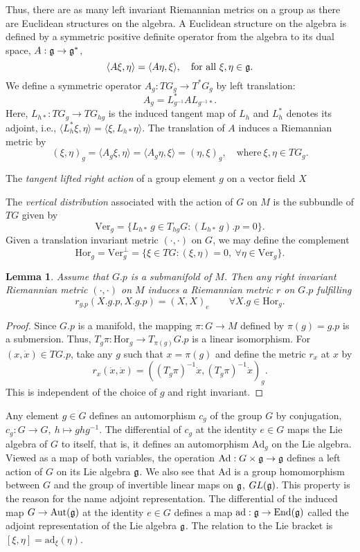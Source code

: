 \documentclass{article}
\theoremstyle{plain}
\newtheorem{lem}[teo]{Lemma}
\theoremstyle{definition}
\newcommand{\Ad}{\ensuremath{\mathrm{Ad}}}
\newcommand{\ad}{\ensuremath{\mathrm{ad}}}
\newcommand{\mf}{\ensuremath{\mathfrak}}
\begin{document}
Thus, there are as many left invariant Riemannian metrics on a group as there are Euclidean structures on the algebra. A Euclidean structure on the algebra is defined by a symmetric positive definite operator from the algebra to its dual space, $A:\mf g\to\mf g^*$,
\[
\langle A \xi,\eta\rangle = \langle A\eta,\xi\rangle,\quad \mathrm{for}\ \mathrm{all}\ \xi,\eta\in \mf g.
\]
We define a symmetric operator $A_g:TG_g\to T^*G_g$ by left translation:
\[
 A_g = L^*_{g^{-1}}AL_{g^{-1}*}.
\]
Here, $L_{h*}:TG_g\to TG_{hg}$ is the induced tangent map of $L_h$ and $L^*_h$ denotes its adjoint, i.e., $\langle L_h^*\xi,\eta\rangle=\langle \xi,L_{h*}\eta\rangle$. The translation of $A$ induces a Riemannian metric by
\[
  (\xi,\eta)_g=\langle A_g \xi,\eta\rangle=\langle A_g \eta,\xi\rangle=(\eta,\xi)_g,\quad \mathrm{where}\ \xi,\eta\in TG_g.
\]

The \textit{tangent lifted right action} of a group element $g$ on a vector field $X$

The \textit{vertical distribution} associated with the action of $G$ on $M$ is the subbundle of $TG$ given by
\[
\mathrm{Ver}_g=\{L_{h*}\,g\in T_{hg}G : (L_{h*}\,g).p=0\}.
\]
Given a translation invariant metric $(\cdot,\cdot)$ on $G$, we may define the complement
\[
\mathrm{Hor}_g=\mathrm{Ver}_g^\perp=\{\xi\in TG : (\xi,\eta)=0,\ \forall\eta\in\mathrm{Ver}_g\}.
\]

\begin{lem}
Assume that $G.p$ is a submanifold of $M$. Then any right invariant Riemannian metric $(\cdot,\cdot)$ on $M$ induces a Riemannian metric $r$ on $G.p$ fulfilling
\[
r_{g.p}(X.g.p,X.g.p)=(X,X)_e \qquad\forall X.g\in\mathrm{Hor}_g.
\]
\end{lem}
\begin{proof}
Since $G.p$ is a manifold, the mapping $\pi:G\to M$ defined by $\pi(g)=g.p$ is a submersion. Thus, $T_g\pi: \mathrm{Hor}_g\to T_{\pi(g)}G.p$ is a linear isomorphism. For $(x,\dot{x})\in TG.p$, take any $g$ such that $x=\pi(g)$ and define the metric $r_x$ at $x$ by
\[
r_x(\dot{x},\dot{x})=\left((T_g\pi)^{-1}\dot{x},(T_g\pi)^{-1}\dot{x}\right)_g.
\]
This is independent of the choice of $g$ and right invariant.
\end{proof}

Any element $g\in G$ defines an automorphism $c_g$ of the group $G$ by conjugation, $c_g:G\to G,\ h\mapsto ghg^{-1}$. The differential of $c_g$ at the identity $e\in G$ maps the Lie algebra of $G$ to itself, that is, it defines an automorphism $\Ad_g$ on the Lie algebra. Viewed as a map of both variables, the operation $\Ad:G\times \mf g\to \mf g$ defines a left action of $G$ on its Lie algebra $\mf g$. We also see that $\Ad$ is a group homomorphism between $G$ and the group of invertible linear maps on $\mf g$, $GL(\mf g)$. This property is the reason for the name adjoint representation. The differential of the induced map $G\to\mathrm{Aut}(\mf g)$ at the identity $e\in G$ defines a map $\ad : \mf g\to \mathrm{End}(\mf g)$ called the adjoint representation of the Lie algebra $\mf g$. The relation to the Lie bracket is $[\xi,\eta]=\ad_\xi(\eta)$.
\end{document}
